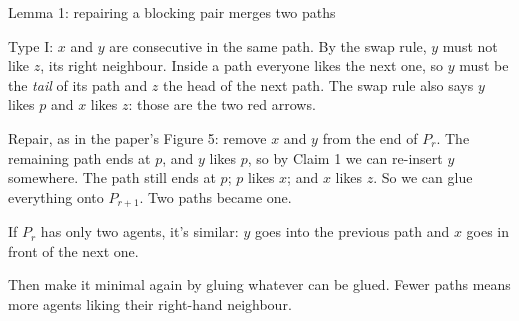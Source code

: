 \documentclass[aspectratio=169,11pt]{beamer}
\begin{document}
\begin{frame}{Lemma 1: repairing a blocking pair merges two paths}
{Type I: $x$ and $y$ are consecutive in the same path. By the swap rule, $y$ must not like $z$, its right neighbour. Inside a path everyone likes the next one, so $y$ must be the \emph{tail} of its path and $z$ the head of the next path. The swap rule also says $y$ likes $p$ and $x$ likes $z$: those are the two red arrows.

Repair, as in the paper's Figure 5: remove $x$ and $y$ from the end of $P_r$. The remaining path ends at $p$, and $y$ likes $p$, so by Claim 1 we can re-insert $y$ somewhere. The path still ends at $p$; $p$ likes $x$; and $x$ likes $z$. So we can glue everything onto $P_{r+1}$. Two paths became one.

If $P_r$ has only two agents, it's similar: $y$ goes into the previous path and $x$ goes in front of the next one.

Then make it minimal again by gluing whatever can be glued. Fewer paths means more agents liking their right-hand neighbour.}
\end{frame}
\end{document}

